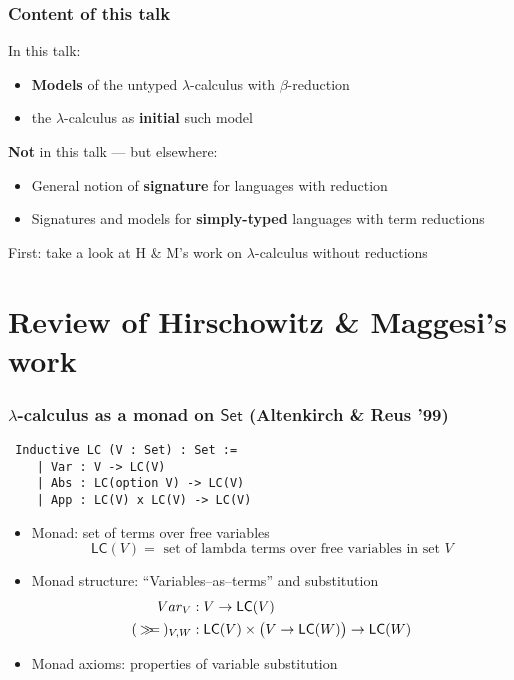 \documentclass[
serif,
mathsans,
]
{beamer}
\newcommand{\bind}[2]{{#1}\mathbin{\gg\hspace{-.8ex}=}{#2}}
\newcommand{\LC}{\mathsf{LC}}
\newcommand{\Set}{\mathsf{Set}}
\begin{document}
\begin{frame}
 \frametitle{Content of this talk}
  
   \begin{block}{In this talk:}
    \begin{itemize}
     \item \textbf{Models} of the untyped $\lambda$-calculus with $\beta$-reduction
     \item the $\lambda$-calculus as \textbf{initial} such model
    \end{itemize}
   \end{block}

   \begin{block}{\textbf{Not} in this talk --- but elsewhere:}
    \begin{itemize}
     \item General notion of \textbf{signature} for languages with reduction
     \item Signatures and models for \textbf{simply-typed} languages with term reductions
    \end{itemize}
   \end{block}

   First: take a look at H \& M's work on $\lambda$-calculus without reductions
   
\end{frame}

\section{Review of Hirschowitz \& Maggesi's work}

\begin{frame}
 \tableofcontents %
\end{frame}


\begin{frame}[fragile]
 \frametitle{$\lambda$-calculus as a monad on $\Set$ (Altenkirch \& Reus '99)}
 
 \begin{lstlisting}
 Inductive LC (V : Set) : Set := 
    | Var : V -> LC(V)
    | Abs : LC(option V) -> LC(V)
    | App : LC(V) x LC(V) -> LC(V)
\end{lstlisting}
 
 \begin{itemize}
  \item  Monad: set of terms over free variables
        \[ \LC(V) = \text{ set of lambda terms over free variables in set } V \]
  \item Monad structure: ``Variables--as--terms'' and substitution
        \begin{align*} Var_{V} &: V \to \LC(V) \\
                       (\bind{}{})_{V,W} &: \LC(V) \times \bigl(V \to \LC(W)\bigr) \to \LC(W)
        \end{align*}

  \item Monad axioms: properties of variable substitution
 \end{itemize}

 
\end{frame}
\end{document}
